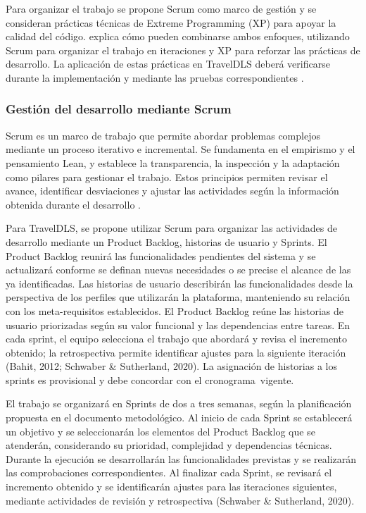 Para organizar el trabajo se propone Scrum como marco de gestión y se consideran prácticas técnicas de Extreme Programming (XP) para apoyar la calidad del código. \textcite{bahit2012scrum} explica cómo pueden combinarse ambos enfoques, utilizando Scrum para organizar el trabajo en iteraciones y XP para reforzar las prácticas de desarrollo. La aplicación de estas prácticas en TravelDLS deberá verificarse durante la implementación y mediante las pruebas correspondientes \parencite{beck2000xp, bahit2012scrum, schwaber2020scrum}.

\subsubsection{Gestión del desarrollo mediante Scrum}

Scrum es un marco de trabajo que permite abordar problemas complejos mediante un proceso iterativo e incremental. Se fundamenta en el empirismo y el pensamiento Lean, y establece la transparencia, la inspección y la adaptación como pilares para gestionar el trabajo. Estos principios permiten revisar el avance, identificar desviaciones y ajustar las actividades según la información obtenida durante el desarrollo \parencite{schwaber2020scrum}.

Para TravelDLS, se propone utilizar Scrum para organizar las actividades de desarrollo mediante un Product Backlog, historias de usuario y Sprints. El Product Backlog reunirá las funcionalidades pendientes del sistema y se actualizará conforme se definan nuevas necesidades o se precise el alcance de las ya identificadas. Las historias de usuario describirán las funcionalidades desde la perspectiva de los perfiles que utilizarán la plataforma, manteniendo su relación con los meta-requisitos establecidos. El Product Backlog reúne las historias de usuario priorizadas según su valor funcional y las dependencias entre tareas. En cada sprint, el equipo selecciona el trabajo que abordará y revisa el incremento obtenido; la retrospectiva permite identificar ajustes para la siguiente iteración (Bahit, 2012; Schwaber \& Sutherland, 2020). La asignación de historias a los sprints es provisional y debe concordar con el \mbox{cronograma vigente}.

El trabajo se organizará en Sprints de dos a tres semanas, según la planificación propuesta en el documento metodológico. Al inicio de cada Sprint se establecerá un objetivo y se seleccionarán los elementos del Product Backlog que se atenderán, considerando su prioridad, complejidad y dependencias técnicas. Durante la ejecución se desarrollarán las funcionalidades previstas y se realizarán las comprobaciones correspondientes. Al finalizar cada Sprint, se revisará el incremento obtenido y se identificarán ajustes para las iteraciones siguientes, mediante actividades de revisión y retrospectiva (Schwaber \& Sutherland, 2020).

